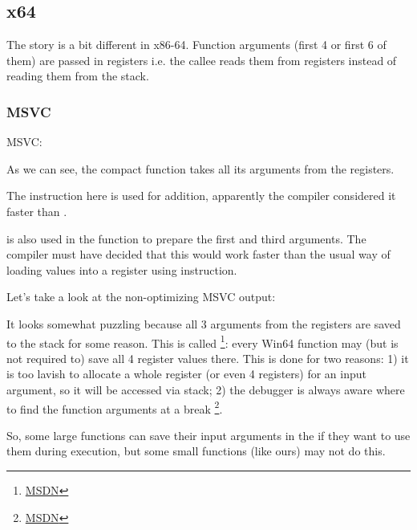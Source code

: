 \subsection{x64}


The story is a bit different in x86-64. Function arguments (first 4 or first 6 of them) 
are passed in registers i.e. the \gls{callee} reads them from registers instead of reading them from the stack.

\subsubsection{MSVC}

\Optimizing MSVC:



As we can see, the compact function \ttf takes all its arguments from the registers.

The \LEA instruction here is used for addition,
apparently the compiler considered it faster than .

\LEA is also used in the \main function to prepare the first and third \ttf arguments. The compiler
must have decided that this would work faster than the usual way of loading values into a register using \MOV instruction.

Let's take a look at the non-optimizing MSVC output:



It looks somewhat puzzling because all 3 arguments from the registers are saved to the stack for some reason.
\label{shadow_space}
This is called 
\footnote{\href{http://msdn.microsoft.com/en-us/library/zthk2dkh(v=vs.80).aspx}{MSDN}}: 
every Win64 function may (but is not required to) save all 4 register values there.
This is done for two reasons: 
1) it is too lavish to allocate a whole register (or even 4 registers) for an input argument,
so it will be accessed via stack;
2) the debugger is always aware where to find the function arguments at a break
\footnote{\href{http://msdn.microsoft.com/en-us/library/ew5tede7(v=VS.90).aspx}{MSDN}}.

So, some large functions can save their input arguments in the  if they want to use them
during execution, but some small functions (like ours) may not do this.

